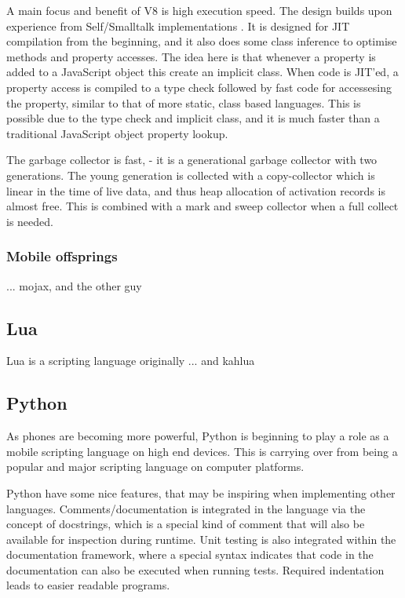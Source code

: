 \documentclass[11pt]{report}
\begin{document}
A main focus and benefit of V8 is high execution speed.
The design builds upon experience from Self/Smalltalk implementations \cite{articles-before-v8}.
It is designed for JIT compilation from the beginning, and it also does some class inference to optimise methods and property accesses.
The idea here is that whenever a property is added to a JavaScript object this create an implicit class. When code is JIT'ed, a property access is compiled to a type check followed by fast code for accessesing the property, similar to that of more static, class based languages. This is possible due to the type check and implicit class, and it is much faster than a traditional JavaScript object property lookup.

The garbage collector is fast, - it is a generational garbage collector with two generations. The young generation is collected with a copy-collector which is linear in the time of live data, and thus heap allocation of activation records is almost free. 
This is combined with a mark and sweep collector when a full collect is needed.

\subsubsection{Mobile offsprings}

... mojax, and the other guy

\subsection{Lua}
Lua is a scripting language originally 
... and kahlua

\subsection{Python}
As phones are becoming more powerful, Python is beginning to play a role as a mobile scripting language on high end devices. This is carrying over from being a popular and major scripting language on computer platforms.

Python have some nice features, that may be inspiring when implementing other languages. Comments/documentation is integrated in the language via the concept of docstrings, which is a special kind of comment that will also be available for inspection during runtime. Unit testing is also integrated within the documentation framework, where a special syntax indicates that code in the documentation can also be executed when running tests.
Required indentation leads to easier readable programs.
\end{document}
